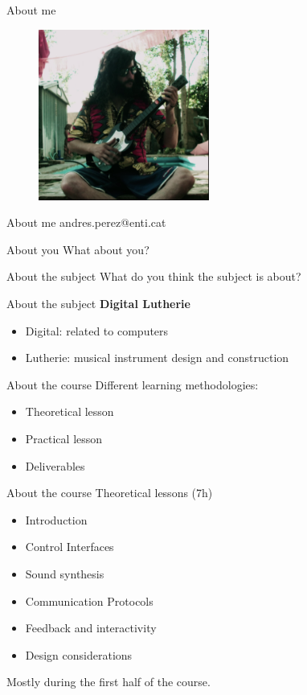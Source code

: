\documentclass{beamer}
\begin{document}
\begin{frame}{About me}
	\begin{figure}[h]
        \includegraphics[width=0.5\textwidth]{foto1_vagabundo.png}	
    \end{figure}
\end{frame}

\begin{frame}{About me}
	andres.perez@enti.cat
\end{frame}

\begin{frame}{About you}
	What about you?
\end{frame}

\begin{frame}{About the subject}
	What do you think the subject is about?
\end{frame}

\begin{frame}{About the subject}
    \textbf{Digital Lutherie}
    \begin{itemize}
        \item Digital: related to computers
        \item Lutherie: musical instrument design and construction
    \end{itemize}
\end{frame}

\begin{frame}{About the course}
	Different learning methodologies:
	\begin{itemize}
		\item Theoretical lesson
		\item Practical lesson
		\item Deliverables
	\end{itemize}
\end{frame}

\begin{frame}{About the course}
	Theoretical lessons (7h)
	\begin{itemize}
		\item Introduction
		\item Control Interfaces
		\item Sound synthesis
		\item Communication Protocols
		\item Feedback and interactivity
		\item Design considerations
	\end{itemize}
	\vspace{5mm}
	Mostly during the first half of the course.
\end{frame}
\end{document}
